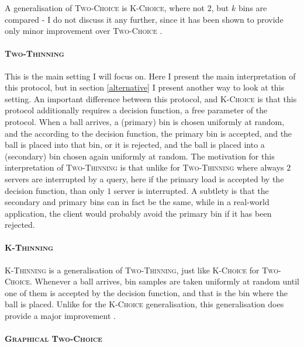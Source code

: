A generalisation of \textsc{Two-Choice} is \textsc{K-Choice}, where not $2$, but $k$ bins are compared - I do not discuss it any further, since it has been shown to provide only minor improvement over \textsc{Two-Choice} \cite{azar1999twochoice}.


\paragraph{\textsc{Two-Thinning}}


This is the main setting I will focus on. Here I present the main interpretation of this protocol, but in section \ref{alternative} I present another way to look at this setting. An important difference between this protocol, and \textsc{K-Choice} is that this protocol additionally requires a decision function, a free parameter of the protocol. When a ball arrives, a (primary) bin is chosen uniformly at random, and the according to the decision function, the primary bin is accepted, and the ball is placed into that bin, or it is rejected, and the ball is placed into a (secondary) bin chosen again uniformly at random. The motivation for this interpretation of \textsc{Two-Thinning} is that unlike for \textsc{Two-Thinning} where always $2$ servers are interrupted by a query, here if the primary load is accepted by the decision function, than only $1$ server is interrupted. A subtlety is that the secondary and primary bins can in fact be the same, while in a real-world application, the client would probably avoid the primary bin if it has been rejected.


\paragraph{\textsc{K-Thinning}}


\textsc{K-Thinning} is a generalisation of \textsc{Two-Thinning}, just like \textsc{K-Choice} for \textsc{Two-Choice}. Whenever a ball arrives, bin samples are taken uniformly at random until one of them is accepted by the decision function, and that is the bin where the ball is placed. Unlike for the \textsc{K-Choice} generalisation, this generalisation does provide a major improvement \cite{feldheim2020dthinning}.


\paragraph{\textsc{Graphical Two-Choice}}

